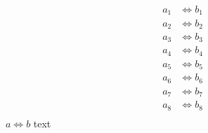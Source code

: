 \begin{align*}
a_1 &\iff b_1 \\
a_2 &\iff b_2 \\
a_3 &\iff b_3 \\
a_4 &\iff b_4 \\
a_5 &\iff b_5 \\
a_6 &\iff b_6 \\
a_7 &\iff b_7 \\
a_8 &\iff b_8 \\
\end{align*}
\ifdraft
$a \iff b$
text
\fi
